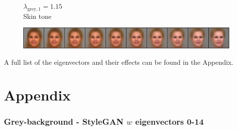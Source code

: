 \documentclass{article}
\begin{document}
\begin{figure}[H]
  \centering
  \begin{minipage}{.18\linewidth}
      \centering
      $\lambda_{\text{grey}, 1} = 1.15$ \\
      Skin tone
  \end{minipage}%
  \hfill
  \begin{minipage}{.81\linewidth}
      \centering
      \includegraphics[width=\linewidth]{eigen/grey_vae_2.png}
  \end{minipage}
\end{figure}

A full list of the eigenvectors and their effects can be found in the Appendix.

\newpage

\newpage
\section*{Appendix}

\subsubsection*{Grey-background - StyleGAN $w$ eigenvectors 0-14}
\end{document}
